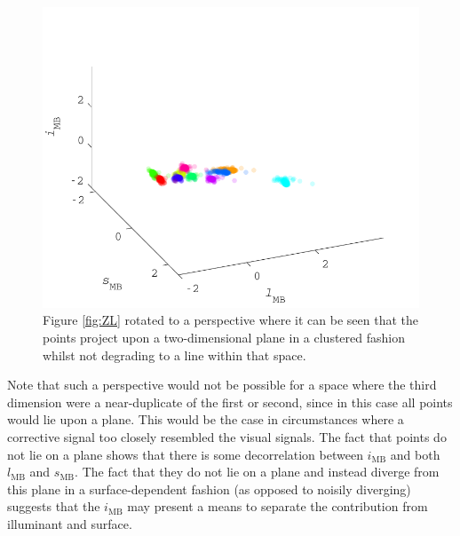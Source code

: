 \begin{figure}[htbp] %
\includegraphics[max width=\textwidth]{figs/comp/thirdDimension/viewpoint.pdf}
 \caption{Figure \ref{fig:ZL} rotated to a perspective where it can be seen that the points project upon a two-dimensional plane in a clustered fashion whilst not degrading to a line within that space.}
 \label{fig:viewpoint}
\end{figure} 

Note that such a perspective would not be possible for a space where the third dimension were a near-duplicate of the first or second, since in this case all points would lie upon a plane. This would be the case in circumstances where a corrective signal too closely resembled the visual signals. The fact that points do not lie on a plane shows that there is some decorrelation between $i_{\text{MB}}$ and both $l_{\text{MB}}$ and $s_{\text{MB}}$. The fact that they do not lie on a plane and instead diverge from this plane in a surface-dependent fashion (as opposed to noisily diverging) suggests that the $i_{\text{MB}}$ may present a means to separate the contribution from illuminant and surface. 



